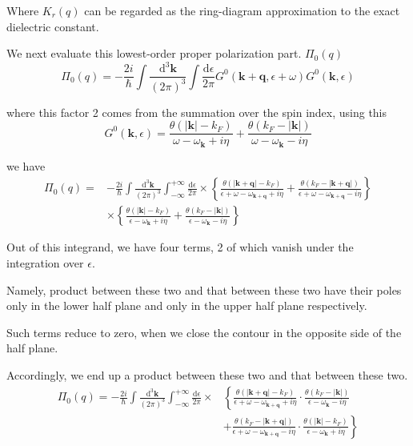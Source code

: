 Where $K_r(q)$ can be regarded as the ring-diagram approximation to the exact dielectric constant.

We next evaluate this lowest-order proper polarization part. $\Pi_0(q)$
\begin{equation} \label{Eqs2.8.12}
\Pi_0(q) = - \frac{2i}{\hbar} \int \frac{\mathrm{d}^3 \mathbf{k}}{(2\pi)^3} \int \frac{\mathrm{d} \epsilon}{2\pi} G^0(\mathbf{k}+\mathbf{q},\epsilon+\omega) G^0(\mathbf{k},\epsilon)
\end{equation}

where this factor 2 comes from the summation over the spin index, using this
\begin{equation} \label{Eqs2.8.13}
G^0(\mathbf{k},\epsilon) = \frac{\theta(|\mathbf{k}|-k_F)}{\omega-\omega_{\mathbf{k}}+i \eta} + \frac{\theta(k_F - |\mathbf{k}|)}{\omega-\omega_{\mathbf{k}}-i \eta}
\end{equation}

we have
\[\begin{split}\Pi_0(q) =&- \frac{2i}{\hbar} \int \frac{\mathrm{d}^3 \mathbf{k}}{(2\pi)^3} \int_{-\infty}^{+\infty} \frac{\mathrm{d} \epsilon}{2\pi} \times \left\{ \frac{\theta(|\mathbf{k}+\mathbf{q}|-k_F)}{\epsilon+\omega-\omega_{\mathbf{k}+\mathbf{q}} +i \eta} + \frac{\theta(k_F - |\mathbf{k}+\mathbf{q}|)}{\epsilon + \omega - \omega_{\mathbf{k}+\mathbf{q}}-i \eta} \right\}\\
&\times \left\{ \frac{\theta(|\mathbf{k}|-k_F)}{\epsilon-\omega_{\mathbf{k}} +i \eta} + \frac{\theta(k_F - |\mathbf{k}|)}{\epsilon - \omega_{\mathbf{k}}-i \eta} \right\} \end{split}\]

Out of this integrand, we have four terms, 2 of which vanish under the integration over $\epsilon$.

Namely, product between these two and that between these two have their poles only in the lower half plane and only in the upper half plane respectively.

Such terms reduce to zero, when we close the contour in the opposite side of the half plane.

Accordingly, we end up a product between these two and that between these two.\[\begin{split}\Pi_0(q) =- \frac{2i}{\hbar} \int \frac{\mathrm{d}^3 \mathbf{k}}{(2\pi)^3} \int_{-\infty}^{+\infty} \frac{\mathrm{d} \epsilon}{2\pi} \times &\left\{  \frac{\theta(|\mathbf{k}+\mathbf{q}|-k_F)}{\epsilon+\omega-\omega_{\mathbf{k}+\mathbf{q}} +i \eta} \cdot \frac{\theta(k_F - |\mathbf{k}|)}{\epsilon - \omega_{\mathbf{k}}-i \eta} \right.\\
&\left.+ \frac{\theta(k_F - |\mathbf{k}+\mathbf{q}|)}{\epsilon + \omega - \omega_{\mathbf{k}+\mathbf{q}}-i \eta} \cdot \frac{\theta(|\mathbf{k}|-k_F)}{\epsilon-\omega_{\mathbf{k}} +i \eta} \right\} 
 \end{split}\]

